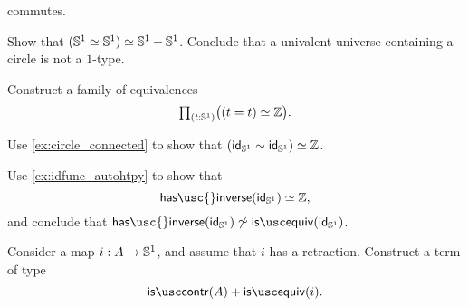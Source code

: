 \begin{exercises}
\begin{subexenum}
commutes.
\end{subexenum}
\item Show that $\eqv{(\eqv{\sphere{1}}{\sphere{1}})}{\sphere{1}+\sphere{1}}$. Conclude that a univalent universe containing a circle is not a $1$-type.
\item \label{ex:is_invertible_id_S1}
\begin{subexenum}
\item Construct a family of equivalences
\begin{equation*}
\prd{t:\sphere{1}} \big(\eqv{(t=t)}{\Z}\big).
\end{equation*}
\item Use \cref{ex:circle_connected} to show that $\eqv{(\idfunc[\sphere{1}]\htpy\idfunc[\sphere{1}])}{\Z}$.
\item Use \cref{ex:idfunc_autohtpy} to show that
\begin{equation*}
\eqv{\mathsf{has\usc{}inverse}(\idfunc[\sphere{1}])}{\Z},
\end{equation*}
and conclude that ${\mathsf{has\usc{}inverse}}(\idfunc[\sphere{1}])\not\simeq{\isequiv(\idfunc[\sphere{1}])}$. 
\end{subexenum}
\item Consider a map $i:A \to \mathbb{S}^{1}$, and assume that $i$ has a retraction. Construct a term of type
  \begin{equation*}
    \iscontr(A)+\isequiv(i).
  \end{equation*}
\end{exercises}
